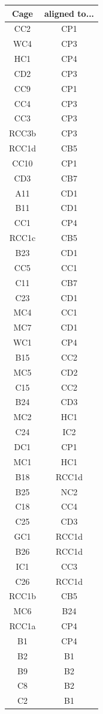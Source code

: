 \documentclass[journal=jacsat,manuscript=article]{achemso}
\begin{document}
{\begin{longtable}{cc}
\hline
 \textbf{Cage}  & \textbf{aligned to...}  \\
 \hline
 CC2 & CP1\\
 WC4 & CP3\\
 HC1 & CP4\\
 CD2 & CP3\\
 CC9 & CP1\\
 CC4 & CP3\\
 CC3 & CP3\\
 RCC3b & CP3\\
 RCC1d & CB5\\
 CC10 & CP1\\
 CD3 & CB7\\
 A11 & CD1\\
 B11 & CD1\\
 CC1 & CP4\\
 RCC1c & CB5\\
 B23 & CD1\\
 CC5 & CC1\\
 C11 & CB7\\
 C23 & CD1\\
 MC4 & CC1\\
 MC7 & CD1\\
 WC1 & CP4\\
 B15 & CC2\\
 MC5 & CD2\\
 C15 & CC2\\
 B24 & CD3\\
 MC2 & HC1\\
 C24 & IC2\\
 DC1 & CP1\\
 MC1 & HC1\\
 B18 & RCC1d\\
 B25 & NC2\\
 C18 & CC4\\
 C25 & CD3\\
 GC1 & RCC1d\\
 B26 & RCC1d\\
 IC1 & CC3\\
 C26 & RCC1d\\
 RCC1b & CB5\\
 MC6 & B24\\
 RCC1a & CP4\\
 B1 & CP4\\
 B2 & B1\\
 B9 & B2\\
 C8 & B2\\
 C2 & B1\\

\end{longtable}}
\end{document}
